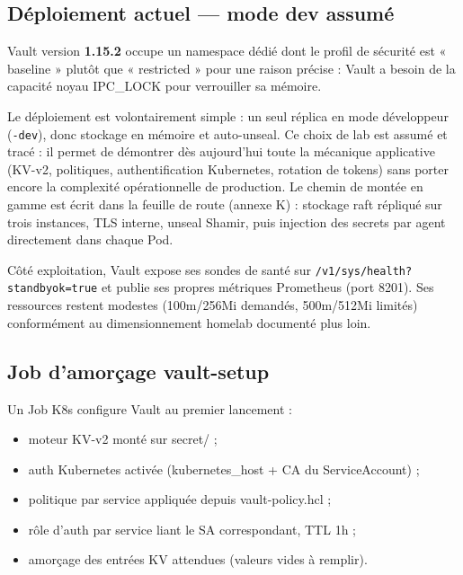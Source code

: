 \documentclass[12pt,a4paper,twoside,openright]{report}
\begin{document}
\subsection{Déploiement actuel --- mode dev assumé}
Vault version \textbf{1.15.2} occupe un namespace dédié dont le profil de sécurité est « baseline » plutôt que « restricted » pour une raison précise : Vault a besoin de la capacité noyau IPC\_LOCK pour verrouiller sa mémoire.

Le déploiement est volontairement simple : un seul réplica en mode développeur (\texttt{-dev}), donc stockage en mémoire et auto-unseal. Ce choix de lab est assumé et tracé : il permet de démontrer dès aujourd'hui toute la mécanique applicative (KV-v2, politiques, authentification Kubernetes, rotation de tokens) sans porter encore la complexité opérationnelle de production. Le chemin de montée en gamme est écrit dans la feuille de route (annexe K) : stockage raft répliqué sur trois instances, TLS interne, unseal Shamir, puis injection des secrets par agent directement dans chaque Pod.

Côté exploitation, Vault expose ses sondes de santé sur \texttt{/v1/sys/health?standbyok=true} et publie ses propres métriques Prometheus (port 8201). Ses ressources restent modestes (100m/256Mi demandés, 500m/512Mi limités) conformément au dimensionnement homelab documenté plus loin.

\subsection{Job d'amorçage vault-setup}
Un Job K8s configure Vault au premier lancement :
\begin{itemize}[itemsep=1pt]
  \item moteur KV-v2 monté sur secret/ ;
  \item auth Kubernetes activée (kubernetes\_host + CA du ServiceAccount) ;
  \item politique par service appliquée depuis vault-policy.hcl ;
  \item rôle d'auth par service liant le SA correspondant, TTL 1h ;
  \item amorçage des entrées KV attendues (valeurs vides à remplir).
\end{itemize}
\end{document}
